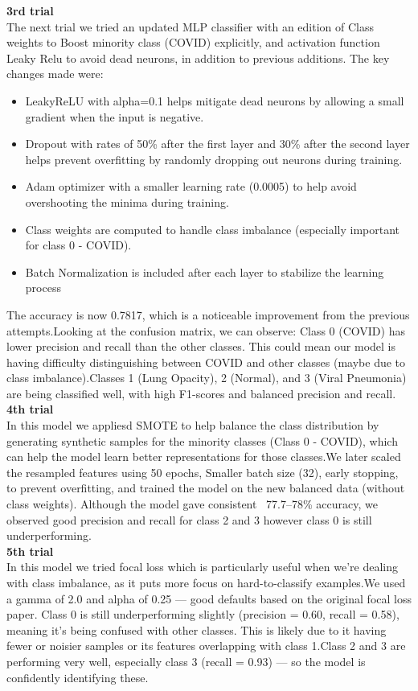 \documentclass{article}
\begin{document}
\textbf{3rd trial }\\
The next trial  we tried an updated MLP classifier with an edition of Class weights to Boost minority class (COVID) explicitly, and activation function Leaky Relu to avoid dead neurons, in addition to previous additions. The key changes made were:
 \begin{itemize}
     \item LeakyReLU with alpha=0.1 helps mitigate dead neurons by allowing a small gradient when the input is negative.
     \item Dropout with rates of 50\% after the first layer and 30\% after the second layer helps prevent overfitting by randomly dropping out neurons during training.
     \item Adam optimizer with a smaller learning rate (0.0005) to help avoid overshooting the minima during training.
     \item Class weights are computed to handle class imbalance (especially important for class 0 - COVID).
     \item Batch Normalization is included after each layer to stabilize the learning process
\end{itemize}
The accuracy is now 0.7817, which is a noticeable improvement from the previous attempts.Looking at the confusion matrix, we can observe: Class 0 (COVID) has lower precision and recall than the other classes. This could mean our model is having difficulty distinguishing between COVID and other classes (maybe due to class imbalance).Classes 1 (Lung Opacity), 2 (Normal), and 3 (Viral Pneumonia) are being classified well, with high F1-scores and balanced precision and recall.\\

\textbf{4th trial }\\
In this model we appliesd SMOTE to help balance the class distribution by generating synthetic samples for the minority classes (Class 0 - COVID), which can help the model learn better representations for those classes.We later scaled the resampled features using 50 epochs, Smaller batch size (32), early stopping, to prevent overfitting, and trained the model on the new balanced data (without class weights). Although the model gave consistent ~77.7–78\% accuracy, we observed good precision and recall for class 2 and 3 however class 0 is still underperforming.\\

\textbf{5th trial }\\
In this model we tried focal loss which is particularly useful when we're dealing with class imbalance, as it puts more focus on hard-to-classify examples.We used a gamma of 2.0 and alpha of 0.25 — good defaults based on the original focal loss paper. Class 0 is still underperforming slightly (precision = 0.60, recall = 0.58), meaning it's being confused with other classes. This is likely due to it having fewer or noisier samples or its features overlapping with class 1.Class 2 and 3 are performing very well, especially class 3 (recall = 0.93) — so the model is confidently identifying these.\\
\end{document}
